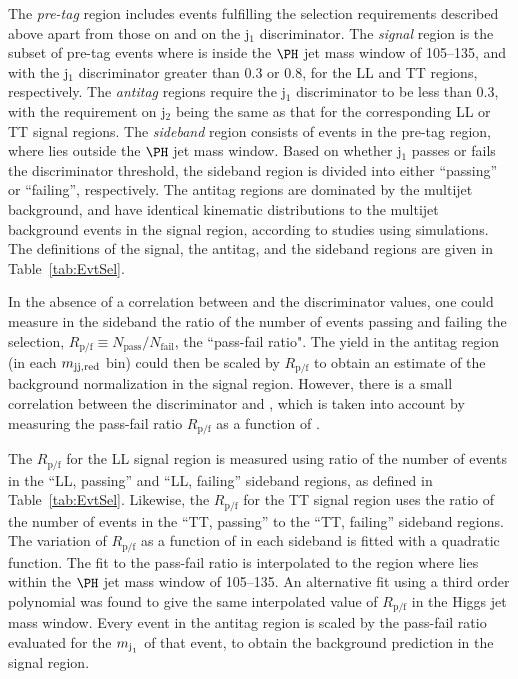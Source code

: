 The \textit{pre-tag} region includes events fulfilling the selection requirements described above apart from those on \mjone and on the j$_{1}$ \Hbbt discriminator.
The \textit{signal} region is the subset of pre-tag events where \mjone is inside the $\PH$ jet mass window of 105--135\GeV, and with the j$_{1}$ \Hbbt discriminator greater than 0.3 or 0.8, for the LL and TT regions, respectively.
The \textit{antitag} regions require the j$_{1}$ \Hbbt discriminator to be less than 0.3, with the requirement on  j$_{2}$ being the same as that for the corresponding LL or TT signal regions.
The \mjone \textit{sideband} region consists of events in the pre-tag region, where
\mjone lies outside the $\PH$ jet mass window. Based on whether  j$_{1}$ passes or fails the \Hbbt discriminator threshold, the sideband region is divided into either ``passing'' or ``failing'', respectively.
The antitag regions are dominated by the multijet background, and have identical kinematic distributions to the multijet background events in the signal region, according to studies using simulations.
The definitions of the signal, the antitag, and the sideband regions are given in Table~\ref{tab:EvtSel}.


In the absence of a correlation between \mjone and the \Hbbt
discriminator values, one could measure in the \mjone sideband the
ratio of the number of events passing and failing the \Hbbt selection,
$R_\text{p/f} \equiv N_\text{pass}/N_\text{fail}$, \ie the ``pass-fail ratio".
The yield in the antitag region (in each $m_{\text{jj,red}}$ bin) could then be scaled by $R_\text{p/f}$ to obtain an estimate of the background normalization in the signal region. However, there is a small correlation between the \Hbbt discriminator and \mjone, which is taken into account by measuring the pass-fail ratio $R_\text{p/f}$ as a function of \mjone.

The $R_\text{p/f}$ for the LL signal region is measured using ratio of the number of events in the ``LL, passing'' and ``LL, failing'' sideband regions, as defined in Table~\ref{tab:EvtSel}. Likewise, the $R_\text{p/f}$ for the TT signal region uses the ratio of the number of events in the ``TT, passing'' to the ``TT, failing'' sideband regions.
The variation of $R_\text{p/f}$ as a function of \mjone in each \mjone sideband is fitted with a quadratic function.
The fit to the pass-fail ratio is interpolated to the region where \mjone lies within the $\PH$ jet mass window of 105--135\GeV. An alternative fit using a third order polynomial was found to give the same interpolated value of $R_\text{p/f}$ in the Higgs jet mass window. Every event in the antitag region is scaled by the pass-fail ratio evaluated for the $m_{\text{j}_{1}}$ of that event, to obtain the background prediction in the signal region.

